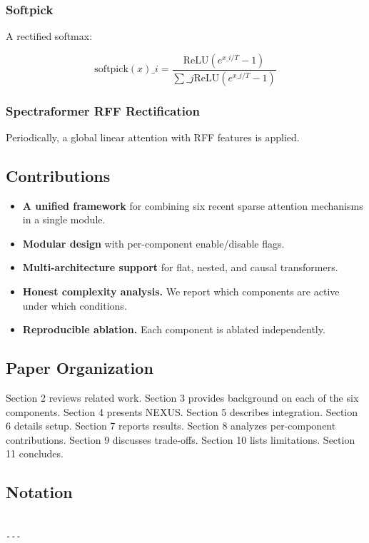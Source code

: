 \subsubsection{Softpick}

A rectified softmax:

\[
\text{softpick}(x)\_i = \frac{\text{ReLU}(e^{x\_i/T} - 1)}{\sum\_j \text{ReLU}(e^{x\_j/T} - 1)}
\tag{1.4}
\]

\subsubsection{Spectraformer RFF Rectification}

Periodically, a global linear attention with RFF features is applied.

\subsection{Contributions}

\begin{itemize}
\item \textbf{A unified framework} for combining six recent sparse attention
  mechanisms in a single module.
\item \textbf{Modular design} with per-component enable/disable flags.
\item \textbf{Multi-architecture support} for flat, nested, and causal transformers.
\item \textbf{Honest complexity analysis.} We report which components are active under
  which conditions.
\item \textbf{Reproducible ablation.} Each component is ablated independently.

\end{itemize}
\subsection{Paper Organization}

Section 2 reviews related work. Section 3 provides background on each of 
the six components. Section 4 presents NEXUS. Section 5 describes 
integration. Section 6 details setup. Section 7 reports results. Section 8 
analyzes per-component contributions. Section 9 discusses trade-offs. 
Section 10 lists limitations. Section 11 concludes.



\subsection{Notation}

\begin{lstlisting}

---
\end{lstlisting}